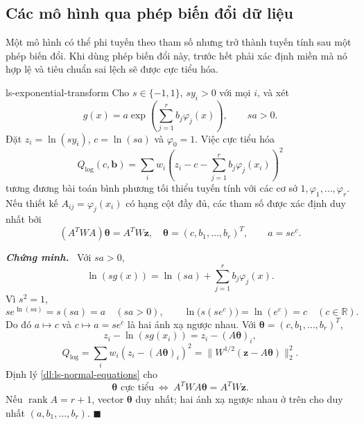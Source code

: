\documentclass[12pt,a4paper,oneside]{book}
\numberwithin{algorithm}{chapter}
\theoremstyle{definition}
\newenvironment{chungminh}{\par\medskip\noindent\textbf{\textit{\color{mainblue}Chứng minh.}}\ }{\hfill$\blacksquare$\par\medskip}
\newcommand{\R}{\mathbb{R}}
\begin{document}
\subsection{Các mô hình qua phép biến đổi dữ liệu}
Một mô hình có thể phi tuyến theo tham số nhưng trở thành tuyến tính sau một phép biến đổi. Khi dùng phép biến đổi này, trước hết phải xác định miền mà nó hợp lệ và tiêu chuẩn sai lệch sẽ được cực tiểu hóa.
\begin{menhde}{}{ls-exponential-transform}
Cho $s\in\{-1,1\}$, $sy_i>0$ với mọi $i$, và xét
\[
 g(x)=a\exp\left(\sum_{j=1}^rb_j\varphi_j(x)\right),\qquad sa>0.
\]
Đặt $z_i=\ln(sy_i)$, $c=\ln(sa)$ và $\varphi_0=1$. Việc cực tiểu hóa
\begin{equation}\label{eq:ls-exponential-objective}
 Q_{\log}(c,\boldsymbol b)
 =\sum_iw_i\left(z_i-c-\sum_{j=1}^rb_j\varphi_j(x_i)\right)^2
\end{equation}
tương đương bài toán bình phương tối thiểu tuyến tính với các cơ sở $1,\varphi_1,\ldots,\varphi_r$. Nếu thiết kế $A_{ij}=\varphi_j(x_i)$ có hạng cột đầy đủ, các tham số được xác định duy nhất bởi
\[
 (A^TWA)\boldsymbol\theta=A^TW\boldsymbol z,
 \quad\boldsymbol\theta=(c,b_1,\ldots,b_r)^T,\qquad a=s e^c.
\]
\end{menhde}
\begin{chungminh}
Với $sa>0$,
\[
 \ln(sg(x))=\ln(sa)+\sum_{j=1}^rb_j\varphi_j(x).
\]
Vì $s^2=1$,
\[
 s e^{\ln(sa)}=s(sa)=a\quad(sa>0),\qquad
 \ln\bigl(s(s e^c)\bigr)=\ln(e^c)=c\quad(c\in\R).
\]
Do đó $a\mapsto c$ và $c\mapsto a=s e^c$ là hai ánh xạ ngược nhau. Với $\boldsymbol\theta=(c,b_1,\ldots,b_r)^T$,
\[
 z_i-\ln(sg(x_i))=z_i-(A\boldsymbol\theta)_i,
\]
\[
 Q_{\log}=\sum_iw_i(z_i-(A\boldsymbol\theta)_i)^2
 =\|W^{1/2}(\boldsymbol z-A\boldsymbol\theta)\|_2^2.
\]
Định lý \ref{dl:ls-normal-equations} cho
\[
 \boldsymbol\theta\text{ cực tiểu}
 \ \Longleftrightarrow\
 A^TWA\boldsymbol\theta=A^TW\boldsymbol z.
\]
Nếu $\operatorname{rank}A=r+1$, vector $\boldsymbol\theta$ duy nhất; hai ánh xạ ngược nhau ở trên cho duy nhất $(a,b_1,\ldots,b_r)$.
\end{chungminh}
\end{document}
